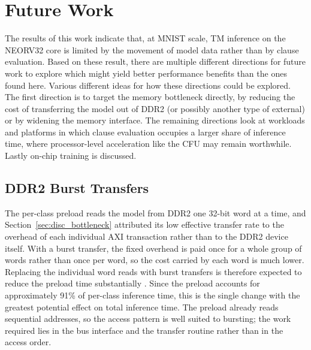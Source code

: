 \section{Future Work}
\label{sec:disc_futurework}

The results of this work indicate that, at MNIST scale, TM inference on the NEORV32 core is limited by the movement of model data rather than by clause evaluation. Based on these result, there are multiple different directions for future work to explore which might yield better performance benefits than the ones found here. Various different ideas for how these directions could be explored. The first direction is to target the memory bottleneck directly, by reducing the cost of transferring the model out of DDR2 (or possibly another type of external) or by widening the memory interface. The remaining directions look at workloads and platforms in which clause evaluation occupies a larger share of inference time, where processor-level acceleration like the CFU may remain worthwhile. Lastly on-chip training is discussed.

\subsection{DDR2 Burst Transfers}
\label{sec:disc_burst}

The per-class preload reads the model from DDR2 one 32-bit word at a time, and Section~\ref{sec:disc_bottleneck} attributed its low effective transfer rate to the overhead of each individual AXI transaction rather than to the DDR2 device itself. With a burst transfer, the fixed overhead is paid once for a whole group of words rather than once per word, so the cost carried by each word is much lower. Replacing the individual word reads with burst transfers is therefore expected to reduce the preload time substantially \cite{Nolting2024Datasheet}. Since the preload accounts for approximately 91\% of per-class inference time, this is the single change with the greatest potential effect on total inference time. The preload already reads sequential addresses, so the access pattern is well suited to bursting; the work required lies in the bus interface and the transfer routine rather than in the access order. 

